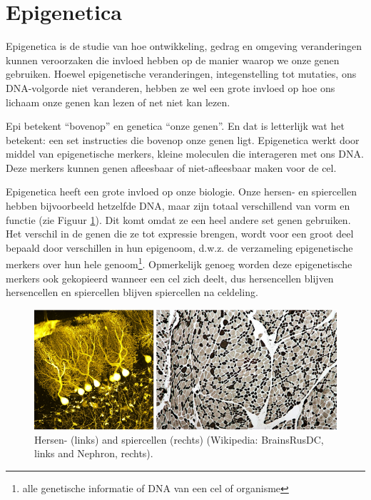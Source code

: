 \documentclass[
  11pt,
]{book}
\begin{document}
\hypertarget{epigenetica}{%
\section{Epigenetica}\label{epigenetica}}

Epigenetica is de studie van hoe ontwikkeling, gedrag en omgeving veranderingen kunnen veroorzaken die invloed hebben op de manier waarop we onze genen gebruiken. Hoewel epigenetische veranderingen, integenstelling tot mutaties, ons DNA-volgorde niet veranderen, hebben ze wel een grote invloed op hoe ons lichaam onze genen kan lezen of net niet kan lezen.

Epi betekent ``bovenop'' en genetica ``onze genen''. En dat is letterlijk wat het betekent: een set instructies die bovenop onze genen ligt. Epigenetica werkt door middel van epigenetische merkers, kleine moleculen die interageren met ons DNA. Deze merkers kunnen genen afleesbaar of niet-afleesbaar maken voor de cel.

Epigenetica heeft een grote invloed op onze biologie. Onze hersen- en spiercellen hebben bijvoorbeeld hetzelfde DNA, maar zijn totaal verschillend van vorm en functie (zie Figuur \ref{fig:brainMuscle}). Dit komt omdat ze een heel andere set genen gebruiken. Het verschil in de genen die ze tot expressie brengen, wordt voor een groot deel bepaald door verschillen in hun epigenoom, d.w.z. de verzameling epigenetische merkers over hun hele genoom\footnote{alle genetische informatie of DNA van een cel of organisme}. Opmerkelijk genoeg worden deze epigenetische merkers ook gekopieerd wanneer een cel zich deelt, dus hersencellen blijven hersencellen en spiercellen blijven spiercellen na celdeling.

\begin{figure}

{\centering \includegraphics[width=0.9\linewidth]{./figs/brainMuscleCells} 

}

\caption{Hersen- (links) and spiercellen (rechts) (Wikipedia: BrainsRusDC, links and Nephron, rechts).}\label{fig:brainMuscle}
\end{figure}
\end{document}

